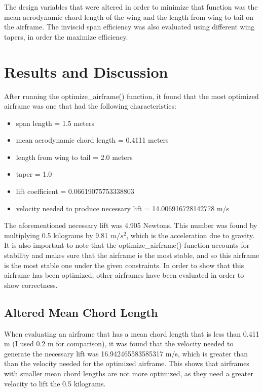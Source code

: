 \documentclass{journal}
\begin{document}
	The design variables that were altered in order to minimize that function was the mean aerodynamic chord length of the wing and the length from wing to tail on the airframe. The inviscid span efficiency was also evaluated using different wing tapers, in order the maximize efficiency.
		
	\section{Results and Discussion}
	
	After running the optimize\_airframe() function, it found that the most optimized airframe was one that had the following characteristics:
	
	\begin{itemize}
		\item span length = 1.5 meters
		\item mean aerodynamic chord length = 0.4111 meters
		\item length from wing to tail = 2.0 meters
		\item taper = 1.0
		\item lift coefficient = 0.06619075753338803
		\item velocity needed to produce necessary lift = 14.006916728142778 m/s
	\end{itemize}

	The aforementioned necessary lift was 4.905 Newtons. This number was found by multiplying 0.5 kilograms by 9.81 \(m/s^2\), which is the acceleration due to gravity. It is also important to note that the optimize\_airframe() function accounts for stability and makes sure that the airframe is the most stable, and so this airframe is the most stable one under the given constraints. In order to show that this airframe has been optimized, other airframes have been evaluated in order to show correctness.\\
	
	\subsection{Altered Mean Chord Length}

	When evaluating an airframe that has a mean chord length that is less than 0.411 m (I used 0.2 m for comparison), it was found that the velocity needed to generate the necessary lift was 16.942465583585317 m/s, which is greater than than the velocity needed for the optimized airframe. This shows that airframes with smaller mean chord lengths are not more optimized, as they need a greater velocity to lift the 0.5 kilograms.\\
	
\end{document}
